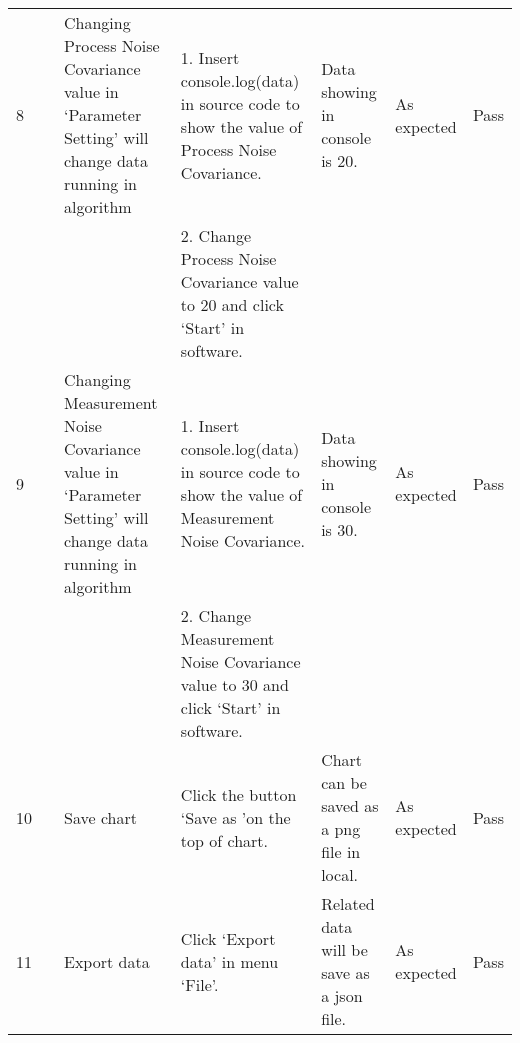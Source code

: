 \documentclass{article}
\begin{document}
\begin{longtable}{|p{10pt}|p{60pt}|p{95pt}|p{130pt}|p{60pt}|p{55pt}|p{25pt}|}
8  &                                       & {Changing Process Noise Covariance value in ‘Parameter Setting’ will change data running in algorithm}     & 1.    Insert console.log(data) in source code to show the value of Process Noise Covariance.     & {Data showing in console is 20.}                                                        & {As expected}                              & {Pass} \\ \cline{4-4}
                    &                                       &                                                                                                                           & 2.    Change Process Noise Covariance value to 20 and click ‘Start’ in software.                 &                                                                                                        &                                                           &                       \\ \cline{1-1} \cline{3-7}
{9}  &                                       & {Changing Measurement Noise Covariance value in ‘Parameter Setting’ will change data running in algorithm} & 1.    Insert console.log(data) in source code to show the value of Measurement Noise Covariance. & {Data showing in console is 30.}                                                        & {As expected}                              & {Pass} \\ \cline{4-4}
                    &                                       &                                                                                                                           & 2.    Change Measurement Noise Covariance value to 30 and click ‘Start’ in software.             &                                                                                                        &                                                           &                       \\ \cline{1-1} \cline{3-7}
10                  &                                       & Save chart                                                                                                                & Click the button ‘Save as ’on the top of chart.                                                  & Chart can be saved as a png file in local.                                                             & As expected                                               & Pass                  \\ \cline{1-1} \cline{3-7}
11                  &                                       & Export data                                                                                                               & Click ‘Export data’ in menu ‘File’.                                                              & Related data will be save as a json file.                                                              & As expected                                               & Pass                  \\ \cline{1-1} \cline{3-7}

\end{longtable}
\end{document}
